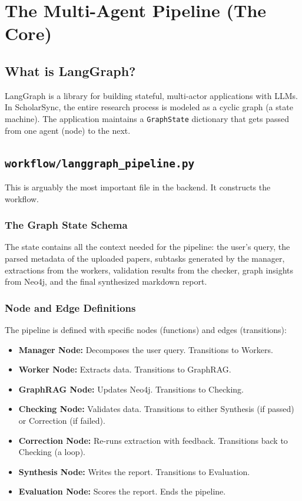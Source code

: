 \documentclass[12pt, a4paper]{report}
\begin{document}
\newpage

\chapter{The Multi-Agent Pipeline (The Core)}

\section{What is LangGraph?}
LangGraph is a library for building stateful, multi-actor applications with LLMs. In ScholarSync, the entire research process is modeled as a cyclic graph (a state machine). The application maintains a \texttt{GraphState} dictionary that gets passed from one agent (node) to the next.

\section{\texttt{workflow/langgraph\_pipeline.py}}
This is arguably the most important file in the backend. It constructs the workflow.

\subsection{The Graph State Schema}
The state contains all the context needed for the pipeline: the user's query, the parsed metadata of the uploaded papers, subtasks generated by the manager, extractions from the workers, validation results from the checker, graph insights from Neo4j, and the final synthesized markdown report.

\subsection{Node and Edge Definitions}
The pipeline is defined with specific nodes (functions) and edges (transitions):
\begin{itemize}
    \item \textbf{Manager Node:} Decomposes the user query. Transitions to Workers.
    \item \textbf{Worker Node:} Extracts data. Transitions to GraphRAG.
    \item \textbf{GraphRAG Node:} Updates Neo4j. Transitions to Checking.
    \item \textbf{Checking Node:} Validates data. Transitions to either Synthesis (if passed) or Correction (if failed).
    \item \textbf{Correction Node:} Re-runs extraction with feedback. Transitions back to Checking (a loop).
    \item \textbf{Synthesis Node:} Writes the report. Transitions to Evaluation.
    \item \textbf{Evaluation Node:} Scores the report. Ends the pipeline.
\end{itemize}
\end{document}
